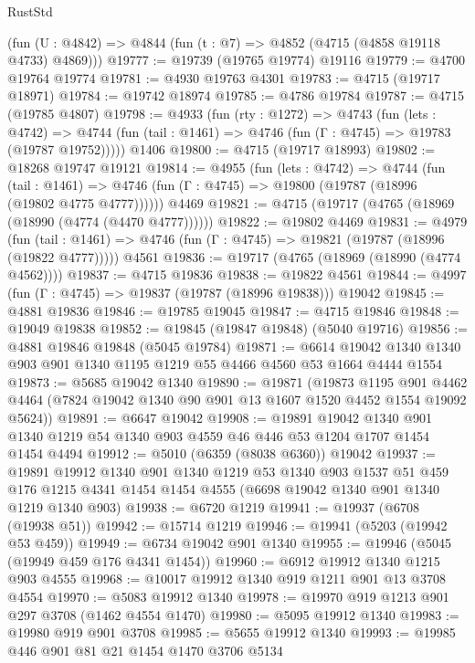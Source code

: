 \begin{lexlean}{RustStd}
\begin{coremodule}
    (fun (U : @4842) => @4844 (fun (t : @7) => @4852 (@4715 (@4858 @19118 @4733) @4869)))
@19777 := @19739 (@19765 @19774) @19116
@19779 := @4700 @19764 @19774
@19781 := @4930 @19763 @4301
@19783 := @4715 (@19717 @18971)
@19784 := @19742 @18974
@19785 := @4786 @19784
@19787 := @4715 (@19785 @4807)
@19798 := @4933
    (fun (rty : @1272) =>
    @4743
      (fun (lets : @4742) =>
      @4744 (fun (tail : @1461) => @4746 (fun (Γ : @4745) => @19783 (@19787 @19752)))))
    @1406
@19800 := @4715 (@19717 @18993)
@19802 := @18268 @19747 @19121
@19814 := @4955
    (fun (lets : @4742) =>
    @4744
      (fun (tail : @1461) =>
      @4746 (fun (Γ : @4745) => @19800 (@19787 (@18996 (@19802 @4775 @4777))))))
    @4469
@19821 := @4715 (@19717 (@4765 (@18969 (@18990 (@4774 (@4470 @4777))))))
@19822 := @19802 @4469
@19831 := @4979
    (fun (tail : @1461) => @4746 (fun (Γ : @4745) => @19821 (@19787 (@18996 (@19822 @4777)))))
    @4561
@19836 := @19717 (@4765 (@18969 (@18990 (@4774 @4562))))
@19837 := @4715 @19836
@19838 := @19822 @4561
@19844 := @4997 (fun (Γ : @4745) => @19837 (@19787 (@18996 @19838))) @19042
@19845 := @4881 @19836
@19846 := @19785 @19045
@19847 := @4715 @19846
@19848 := @19049 @19838
@19852 := @19845 (@19847 @19848) (@5040 @19716)
@19856 := @4881 @19846 @19848 (@5045 @19784)
@19871 := @6614 @19042 @1340 @1340 @903 @901 @1340 @1195 @1219 @55 @4466 @4560 @53 @1664 @4444 @1554
@19873 := @5685 @19042 @1340
@19890 := @19871
    (@19873
      @1195
      @901
      @4462
      @4464
      (@7824 @19042 @1340 @90 @901 @13 @1607 @1520 @4452 @1554 @19092 @5624))
@19891 := @6647 @19042
@19908 := @19891
    @19042
    @1340
    @901
    @1340
    @1219
    @54
    @1340
    @903
    @4559
    @46
    @446
    @53
    @1204
    @1707
    @1454
    @1454
    @4494
@19912 := @5010 (@6359 (@8038 @6360)) @19042
@19937 := @19891
    @19912
    @1340
    @901
    @1340
    @1219
    @53
    @1340
    @903
    @1537
    @51
    @459
    @176
    @1215
    @4341
    @1454
    @1454
    @4555
    (@6698 @19042 @1340 @901 @1340 @1219 @1340 @903)
@19938 := @6720 @1219
@19941 := @19937 (@6708 (@19938 @51))
@19942 := @15714 @1219
@19946 := @19941 (@5203 (@19942 @53 @459))
@19949 := @6734 @19042 @901 @1340
@19955 := @19946 (@5045 (@19949 @459 @176 @4341 @1454))
@19960 := @6912 @19912 @1340 @1215 @903 @4555
@19968 := @10017 @19912 @1340 @919 @1211 @901 @13 @3708 @4554
@19970 := @5083 @19912 @1340
@19978 := @19970 @919 @1213 @901 @297 @3708 (@1462 @4554 @1470)
@19980 := @5095 @19912 @1340
@19983 := @19980 @919 @901 @3708
@19985 := @5655 @19912 @1340
@19993 := @19985 @446 @901 @81 @21 @1454 @1470 @3706 @5134

\end{coremodule}
\end{lexlean}

